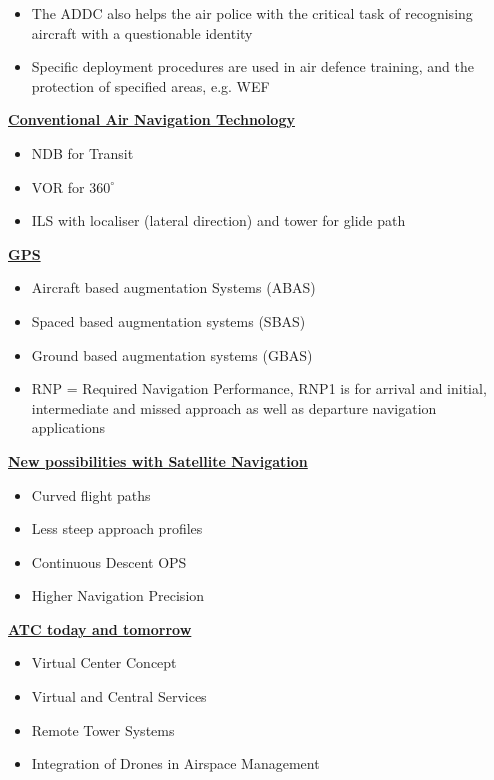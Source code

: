 \documentclass[9pt, landscape, fleqn]{scrartcl}
\begin{document}
\begin{multicols*}{3}
\begin{itemize}
    \item The ADDC also helps the air police with the critical task of recognising aircraft with a questionable identity 
    \item Specific deployment procedures are used in air defence training, and the protection of specified areas, e.g. WEF
\end{itemize}
\underline{\textbf{Conventional Air Navigation Technology}}
\begin{itemize}
    \item NDB for Transit 
    \item VOR for $360^\circ$
    \item ILS with localiser (lateral direction) and tower for glide path 
\end{itemize}
\underline{\textbf{GPS}}
\begin{itemize}
    \item Aircraft based augmentation Systems (ABAS)
    \item Spaced based augmentation systems (SBAS)
    \item Ground based augmentation systems (GBAS)
    \item RNP = Required Navigation Performance, RNP1 is for arrival and initial, intermediate and missed approach as well as departure navigation applications
\end{itemize}
\underline{\textbf{New possibilities with Satellite Navigation}}
\begin{itemize}
    \item Curved flight paths 
    \item Less steep approach profiles 
    \item Continuous Descent OPS 
    \item Higher Navigation Precision 
\end{itemize}
\underline{\textbf{ATC today and tomorrow}}
\begin{itemize}
    \item Virtual Center Concept 
    \item Virtual and Central Services 
    \item Remote Tower Systems 
    \item Integration of Drones in Airspace Management 
\end{itemize}
\newpage

\end{multicols*}
\end{document}
